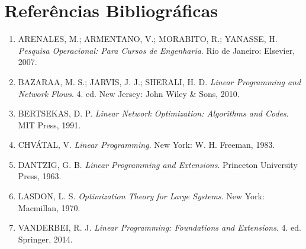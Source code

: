 \documentclass[12pt, a4paper]{article}
\begin{document}
\section{Referências Bibliográficas}
\begin{enumerate}
    \item ARENALES, M.; ARMENTANO, V.; MORABITO, R.; YANASSE, H. \textit{Pesquisa Operacional: Para Cursos de Engenharia}. Rio de Janeiro: Elsevier, 2007.
    \item BAZARAA, M. S.; JARVIS, J. J.; SHERALI, H. D. \textit{Linear Programming and Network Flows}. 4. ed. New Jersey: John Wiley \& Sons, 2010.
    \item BERTSEKAS, D. P. \textit{Linear Network Optimization: Algorithms and Codes}. MIT Press, 1991.
    \item CHVÁTAL, V. \textit{Linear Programming}. New York: W. H. Freeman, 1983.
    \item DANTZIG, G. B. \textit{Linear Programming and Extensions}. Princeton University Press, 1963.
    \item LASDON, L. S. \textit{Optimization Theory for Large Systems}. New York: Macmillan, 1970.
    \item VANDERBEI, R. J. \textit{Linear Programming: Foundations and Extensions}. 4. ed. Springer, 2014.
\end{enumerate}
\end{document}
